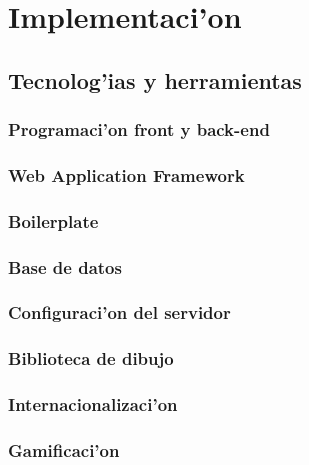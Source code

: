 \section{Implementaci'on}
\label{sec:implementacion}


\subsection{Tecnolog'ias y herramientas}
\label{sec:tecnologias_y_herramientas}

\subsubsection{Programaci'on front y back-end}
\label{sub:programacion_front_y_back_end}

\subsubsection{Web Application Framework}
\label{sub:web_application_framework}

\subsubsection{Boilerplate}
\label{sub:boilerplate}

\subsubsection{Base de datos}
\label{sub:base_de_datos}

\subsubsection{Configuraci'on del servidor}
\label{sub:configuracion_del_servidor}

\subsubsection{Biblioteca de dibujo}
\label{sub:biblioteca_de_dibujo}

\subsubsection{Internacionalizaci'on}
\label{sub:internacionalizacion}

\subsubsection{Gamificaci'on}
\label{sub:gamificacion}

